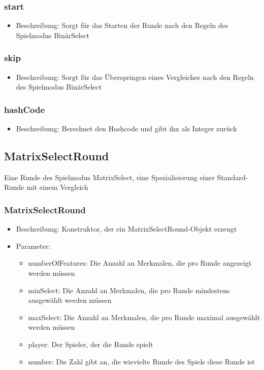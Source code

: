 \documentclass[a4paper]{scrreprt}
\begin{document}
	\subsubsection{start}
	\begin{itemize}
		\item Beschreibung: Sorgt für das Starten der Runde nach den Regeln des Spielmodus BinärSelect
	\end{itemize}
	\subsubsection{skip}
	\begin{itemize}
		\item Beschreibung: Sorgt für das Überspringen eines Vergleiches nach den Regeln des Spielmodus BinärSelect
	\end{itemize}
	\subsubsection{hashCode}
	\begin{itemize}
	\item Beschreibung: Berechnet den Hashcode und gibt ihn als Integer zurück
	\end{itemize}

	\subsection{MatrixSelectRound}
	Eine Runde des Spielmodus MatrixSelect, eine Spezialisierung einer Standard-Runde mit einem Vergleich
	\subsubsection{MatrixSelectRound}
		\begin{itemize}
		\item Beschreibung: Konstruktor, der ein MatrixSelectRound-Objekt erzeugt
		\item Parameter:
		\begin{itemize}
				\item numberOfFeatures: Die Anzahl an Merkmalen, die pro Runde angezeigt werden müssen
				\item minSelect: Die Anzahl an Merkmalen, die pro Runde mindestens ausgewählt werden müssen
				\item maxSelect: Die Anzahl an Merkmalen, die pro Runde maximal ausgewählt werden müssen
				\item player: Der Spieler, der die Runde spielt
				\item number: Die Zahl gibt an, die wievielte Runde des Spiels diese Runde ist
				\end{itemize}
		\end{itemize}
\end{document}
